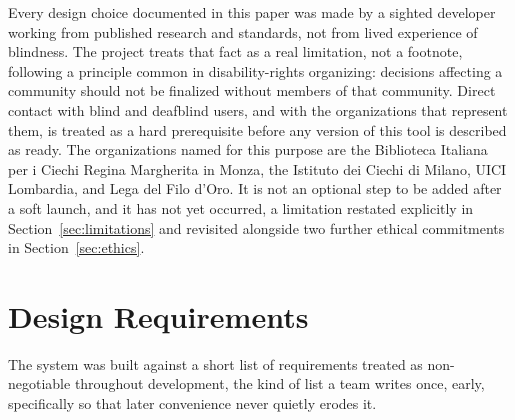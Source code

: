 \documentclass[conference]{IEEEtran}
\begin{document}
Every design choice documented in this paper was made by a sighted developer working from published research and standards, not from lived experience of blindness. The project treats that fact as a real limitation, not a footnote, following a principle common in disability-rights organizing: decisions affecting a community should not be finalized without members of that community. Direct contact with blind and deafblind users, and with the organizations that represent them, is treated as a hard prerequisite before any version of this tool is described as ready. The organizations named for this purpose are the Biblioteca Italiana per i Ciechi Regina Margherita in Monza, the Istituto dei Ciechi di Milano, UICI Lombardia, and Lega del Filo d'Oro. It is not an optional step to be added after a soft launch, and it has not yet occurred, a limitation restated explicitly in Section~\ref{sec:limitations} and revisited alongside two further ethical commitments in Section~\ref{sec:ethics}.

\section{Design Requirements}\label{sec:requirements}

The system was built against a short list of requirements treated as non-negotiable throughout development, the kind of list a team writes once, early, specifically so that later convenience never quietly erodes it.
\end{document}
